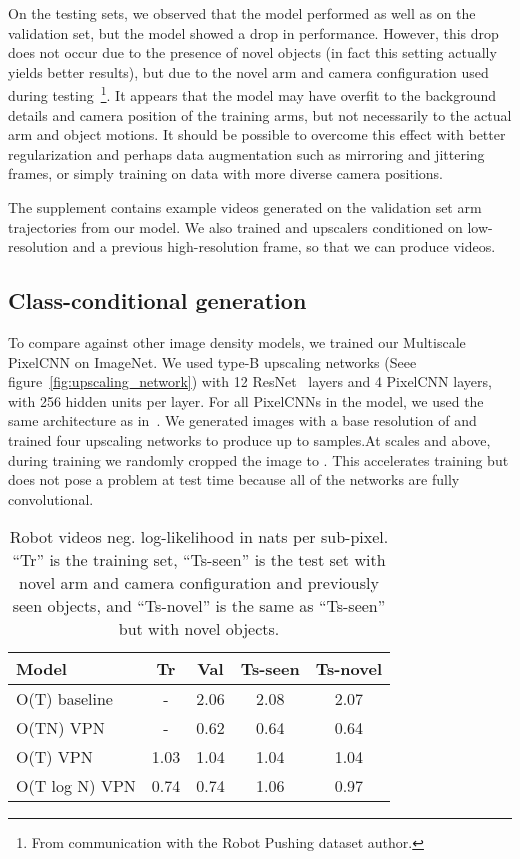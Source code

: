 \documentclass{article}
\begin{document}
On the testing sets, we observed that the  model performed as well as on the validation set, but the  model showed a drop in performance.
However, this drop does not occur due to the presence of novel objects (in fact this setting actually yields better results), but due to the novel arm and camera configuration used during testing~\footnote{From communication with the Robot Pushing dataset author.}.
It appears that the  model may have overfit to the background details and camera position of the  training arms, but not necessarily to the actual arm and object motions.
It should be possible to overcome this effect with better regularization and perhaps data augmentation such as mirroring and jittering frames, or simply training on data with more diverse camera positions.

The supplement contains example videos generated on the validation set arm trajectories from our  model.
We also trained  and  upscalers conditioned on low-resolution and a previous high-resolution frame, so that we can produce  videos.


\subsection{Class-conditional generation}
To compare against other image density models, we trained our Multiscale PixelCNN on ImageNet.
We used type-B upscaling networks (Seee figure~\ref{fig:upscaling_network}) with 12 ResNet~\cite{he2016identity} layers and 4 PixelCNN layers, with 256 hidden units per layer.
For all PixelCNNs in the model, we used the same architecture as in~\citep{oord2016conditional}.
We generated images with a base resolution of  and trained four upscaling networks to produce up to  samples.At scales  and above, during training we randomly cropped the image to .
This accelerates training but does not pose a problem at test time because all of the networks are fully convolutional.


\begin{table}[t!]
\begin{center}
\begin{tabular}{| l | c | c | c | c |}
\hline
\textbf{Model} & \textbf{Tr} & \textbf{Val} & \textbf{Ts-seen} & \textbf{Ts-novel} \\
\hline
\hline
O(T) baseline & - & 2.06 & 2.08 & 2.07 \\ \hline
O(TN) VPN & - & 0.62 & 0.64 & 0.64 \\ 
\hline
\hline
O(T) VPN & 1.03 & 1.04 & 1.04 & 1.04 \\ \hline
O(T log N) VPN & 0.74 & 0.74 & 1.06 & 0.97 \\ \hline
\end{tabular}
\end{center}
\vspace{-0.1in}
\caption{Robot videos neg. log-likelihood in nats per sub-pixel. ``Tr'' is the training set, ``Ts-seen'' is the test set with novel arm and camera configuration and previously seen objects, and ``Ts-novel'' is the same as ``Ts-seen'' but with novel objects.\label{tab:robot}}
\vspace{-0.1in}
\end{table}
\end{document}
